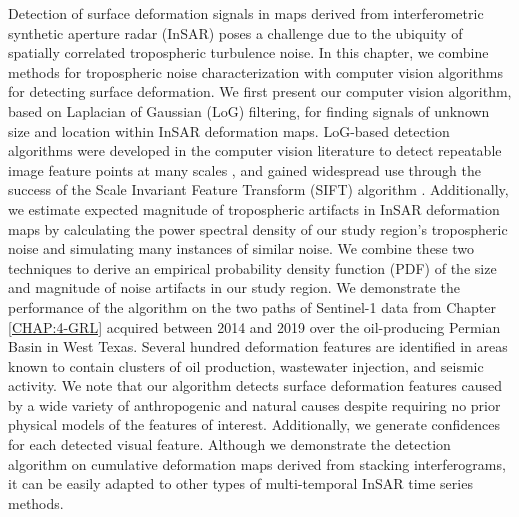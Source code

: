 Detection of surface deformation signals in maps derived from interferometric synthetic aperture radar (InSAR) poses a challenge due to the ubiquity of spatially correlated tropospheric turbulence noise. In this chapter,
we combine methods for tropospheric noise characterization with computer vision algorithms for detecting surface deformation.
We first present our computer vision algorithm, based on Laplacian of Gaussian (LoG) filtering, for finding signals of unknown size and location within InSAR deformation maps.
LoG-based detection algorithms were developed in the computer vision literature to detect repeatable image feature points at many scales \citep{Witkin1987ScaleSpaceFiltering, Lindeberg1998FeatureDetectionAutomatic}, and gained widespread use through the success of the Scale Invariant Feature Transform (SIFT) algorithm \citep{Lowe2004DistinctiveImageFeatures}. 
Additionally, we estimate expected magnitude of tropospheric artifacts in InSAR deformation maps by calculating the power spectral density of our study region's tropospheric noise and simulating many instances of similar noise.
We combine these two techniques to derive an empirical probability density function (PDF) of the size and magnitude of noise artifacts in our study region.
We demonstrate the performance of the algorithm on the two paths of Sentinel-1 data from Chapter \ref{CHAP:4-GRL} acquired between 2014 and 2019 over the oil-producing Permian Basin in West Texas. 
Several hundred deformation features are identified in areas known to contain clusters of oil production, wastewater injection, and seismic activity. 
We note that our algorithm detects surface deformation features caused by a wide variety of anthropogenic and natural causes despite requiring no prior physical models of the features of interest. Additionally, we generate confidences for each detected visual feature. Although we demonstrate the detection algorithm on cumulative deformation maps derived from stacking interferograms, it can be easily adapted to other types of multi-temporal InSAR time series methods.




